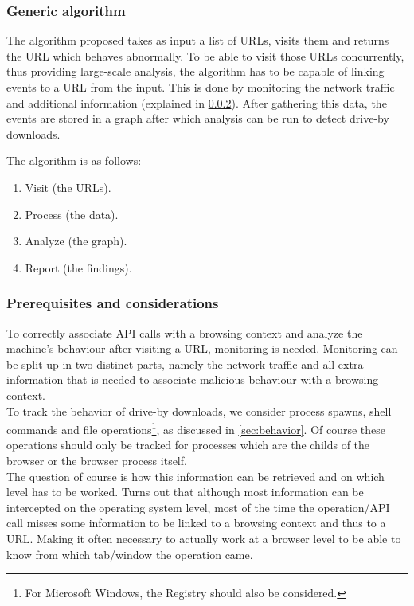 \subsubsection{Generic algorithm}

The algorithm proposed takes as input a list of URLs, visits them and returns the URL which behaves abnormally. To be able to visit those URLs concurrently, thus providing large-scale analysis, the algorithm has to be capable of linking events to a URL from the input. This is done by monitoring the network traffic and additional information (explained in \ref{sec:prereq}). After gathering this data, the events are stored in a graph after which analysis can be run to detect drive-by downloads.

The algorithm is as follows:

\begin{changemargin}{5cm}{0cm}
\begin{enumerate}
\item Visit (the URLs).
\item Process (the data).
\item Analyze (the graph).
\item Report (the findings).
\end{enumerate}
\end{changemargin}

\subsubsection{Prerequisites and considerations}
\label{sec:prereq}

To correctly associate API calls with a browsing context and analyze the machine's behaviour after visiting a URL, monitoring is needed. Monitoring can be split up in two distinct parts, namely the network traffic and all extra information that is needed to associate malicious behaviour with a browsing context.\\

To track the behavior of drive-by downloads, we consider process spawns, shell commands and file operations\footnote{For Microsoft Windows, the Registry should also be considered.}, as discussed in \ref{sec:behavior}. Of course these operations should only be tracked for processes which are the childs of the browser or the browser process itself.\\

The question of course is how this information can be retrieved and on which level has to be worked. Turns out that although most information can be intercepted on the operating system level, most of the time the operation/API call misses some information to be linked to a browsing context and thus to a URL. Making it often necessary to actually work at a browser level to be able to know from which tab/window the operation came.\\%

